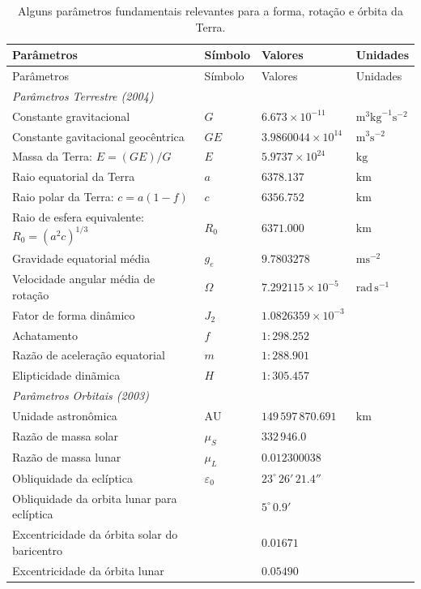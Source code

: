 \documentclass[]{book}
\theoremstyle{definition}
\theoremstyle{definition}
\theoremstyle{definition}
\theoremstyle{remark}
\begin{document}
\begin{longtable}[]{@{}llll@{}}
\caption{\label{tab:parametros} Alguns parâmetros fundamentais relevantes para a forma, rotação e órbita da Terra.}\tabularnewline
\toprule
Parâmetros & Símbolo & Valores & Unidades\tabularnewline
\midrule
\endfirsthead
\toprule
Parâmetros & Símbolo & Valores & Unidades\tabularnewline
\midrule
\endhead
\emph{Parâmetros Terrestre (2004)} & & &\tabularnewline
Constante gravitacional & \(G\) & \(6.673\times 10^{-11}\) & \(\text{m}^3 \text{kg}^{-1}\text{s}^{-2}\)\tabularnewline
Constante gavitacional geocêntrica & \(GE\) & \(3.9860044\times 10^{14}\) & \(\text{m}^3 \text{s}^{-2}\)\tabularnewline
Massa da Terra: \(E=(GE)/G\) & \(E\) & \(5.9737\times 10^{24}\) & \(\text{kg}\)\tabularnewline
Raio equatorial da Terra & \(a\) & \(6378.137\) & \(\text{km}\)\tabularnewline
Raio polar da Terra: \(c=a(1-f)\) & \(c\) & \(6356.752\) & \(\text{km}\)\tabularnewline
Raio de esfera equivalente: \(R_0=(a^2c)^{1/3}\) & \(R_0\) & \(6371.000\) & \(\text{km}\)\tabularnewline
Gravidade equatorial média & \(g_e\) & \(9.7803278\) & \(\text{m}\text{s}^{-2}\)\tabularnewline
Velocidade angular média de rotação & \(\Omega\) & \(7.292115\times 10^{-5}\) & \(\text{rad}\,\text{s}^{-1}\)\tabularnewline
Fator de forma dinâmico & \(J_2\) & \(1.0826359\times 10^{-3}\) &\tabularnewline
Achatamento & \(f\) & \(1:298.252\) &\tabularnewline
Razão de aceleração equatorial & \(m\) & \(1:288.901\) &\tabularnewline
Elipticidade dinãmica & \(H\) & \(1:305.457\) &\tabularnewline
\emph{Parâmetros Orbitais (2003)} & & &\tabularnewline
Unidade astronômica & \(\text{AU}\) & \(149\,597\,870.691\) & \(\text{km}\)\tabularnewline
Razão de massa solar & \(\mu_S\) & \(332\,946.0\) &\tabularnewline
Razão de massa lunar & \(\mu_L\) & \(0.012300038\) &\tabularnewline
Obliquidade da eclíptica & \(\varepsilon_0\) & \(23^\circ\, 26'\,21.4''\) &\tabularnewline
Obliquidade da orbita lunar para eclíptica & & \(5^\circ\, 0.9'\) &\tabularnewline
Excentricidade da órbita solar do baricentro & & \(0.01671\) &\tabularnewline
Excentricidade da órbita lunar & & \(0.05490\) &\tabularnewline
\bottomrule
\end{longtable}
\end{document}
